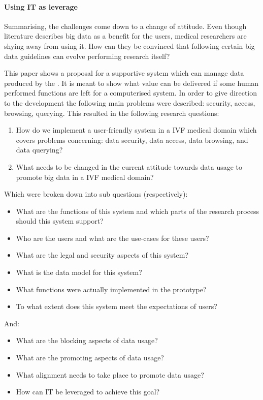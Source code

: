 \paragraph{Using IT as leverage}
Summarising, the challenges come down to a change of attitude.
Even though literature describes big data as a benefit for the users, medical researchers are shying away from using it.
How can they be convinced that following certain big data guidelines can evolve performing research itself?

This paper shows a proposal for a supportive system which can manage data produced by the \project{}.
It is meant to show what value can be delivered if some human performed functions are left for a computerised system.
In order to give direction to the development the following main problems were described: security, access, browsing, querying.
This resulted in the following research questions:

\begin{enumerate}
	\item How do we implement a user-friendly system in a IVF medical domain which covers problems concerning: data security, data access, data browsing, and data querying?
	\item What needs to be changed in the current attitude towards data usage to promote big data in a IVF medical domain?
\end{enumerate}

Which were broken down into sub questions (respectively):

\begin{itemize}
	\item What are the functions of this system and which parts of the research process should this system support?
	\item Who are the users and what are the use-cases for these users?
	\item What are the legal and security aspects of this system?
	\item What is the data model for this system?
	\item What functions were actually implemented in the prototype?
	\item To what extent does this system meet the expectations of users?
\end{itemize}

And:

\begin{itemize}
	\item What are the blocking aspects of data usage?
	\item What are the promoting aspects of data usage?
	\item What alignment needs to take place to promote data usage?
	\item How can IT be leveraged to achieve this goal?
\end{itemize}
